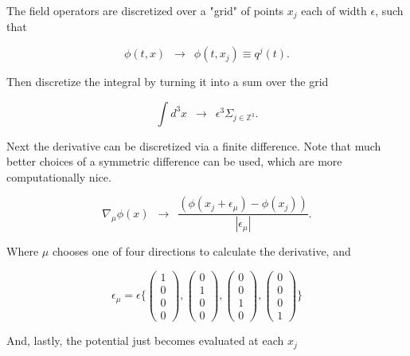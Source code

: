 \noindent The field operators are discretized over a "grid" of points $x_j$ each of width $\epsilon$, such that

\begin{equation}
\phi(t, x) \,\,\, \rightarrow \,\,\, \phi(t, x_j) \equiv q^j (t).
\end{equation}

\noindent Then discretize the integral by turning it into a sum over the grid

\begin{equation}
\int d^3 x  \,\,\, \rightarrow \,\,\, \epsilon^3 \Sigma_{j \in \mathbb{Z}^3} .
\end{equation}

\noindent Next the derivative can be discretized via a finite difference. Note that much better choices of a symmetric difference can be used, which are more computationally nice.

\begin{equation}
\nabla_\mu \phi(x) \,\,\, \rightarrow  \,\,\, \frac{(\phi(x_j + \epsilon_\mu) - \phi(x_j))}{|\epsilon_\mu|}.
\end{equation}

\noindent Where $\mu$ chooses one of four directions to calculate the derivative, and

\begin{equation}
\epsilon_{\mu} = \epsilon \{ \left(\begin{smallmatrix}1\\0\\0\\0\end{smallmatrix}\right), \left(\begin{smallmatrix}0\\1\\0\\0\end{smallmatrix}\right), \left(\begin{smallmatrix}0\\0\\1\\0\end{smallmatrix}\right), \left(\begin{smallmatrix}0\\0\\0\\1\end{smallmatrix}\right) \}
\end{equation}

\noindent And, lastly, the potential just becomes evaluated at each $x_j$

